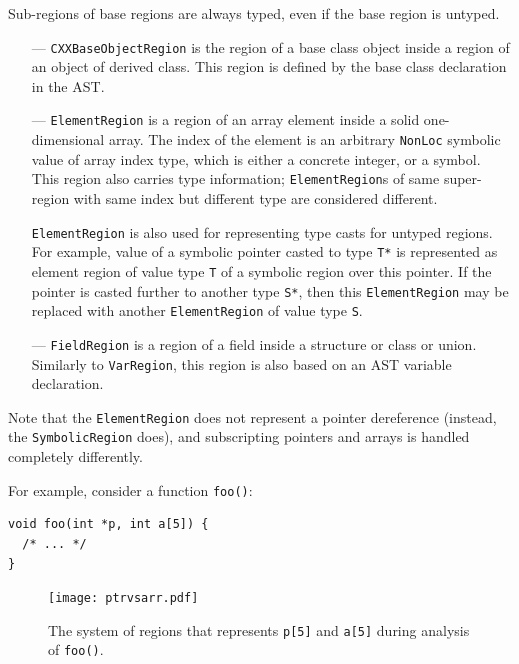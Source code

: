 \documentclass[a4paper,12pt]{article}
\newenvironment{nobr}{\begin{minipage}{\textwidth}\setlength\parskip{1em}
}{\end{minipage}\ignorespacesafterend}
\begin{document}
Sub-regions of base regions are always typed, even if the base region is untyped.

\begin{itemize}
\item[---]\lstinline|CXXBaseObjectRegion| is the region of a base class object inside a region of an object of derived class. This region is defined by the base class declaration in the AST.
\item[---]\lstinline|ElementRegion| is a region of an array element inside a solid one-dimensional array. The index of the element is an arbitrary \lstinline|NonLoc| symbolic value of array index type, which is either a concrete integer, or a symbol. This region also carries type information; \lstinline|ElementRegion|s of same super-region with same index but different type are considered different.

\lstinline|ElementRegion| is also used for representing type casts for untyped regions. For example, value of a symbolic pointer casted to type \lstinline|T*| is represented as element region of value type \lstinline|T| of a symbolic region over this pointer. If the pointer is casted further to another type \lstinline|S*|, then this \lstinline|ElementRegion| may be replaced with another \lstinline|ElementRegion| of value type \lstinline|S|.
\item[---]\lstinline|FieldRegion| is a region of a field inside a structure or class or union. Similarly to \lstinline|VarRegion|, this region is also based on an AST variable declaration.
\end{itemize}

Note that the \lstinline|ElementRegion| does not represent a pointer dereference (instead, the \lstinline|SymbolicRegion| does), and subscripting pointers and arrays is handled completely differently.

\begin{nobr}
For example, consider a function \lstinline|foo()|:

\begin{lstlisting}[style=cplusplus,numbers=none]
void foo(int *p, int a[5]) {
  /* ... */
}
\end{lstlisting}
\end{nobr}

\begin{figure}[!ht]\center
\texttt{[image: ptrvsarr.pdf]}
\caption{The system of regions that represents \lstinline|p[5]| and \lstinline|a[5]| during analysis of \lstinline|foo()|.}
\label{fig:ptrvsarr}
\end{figure}
\end{document}

